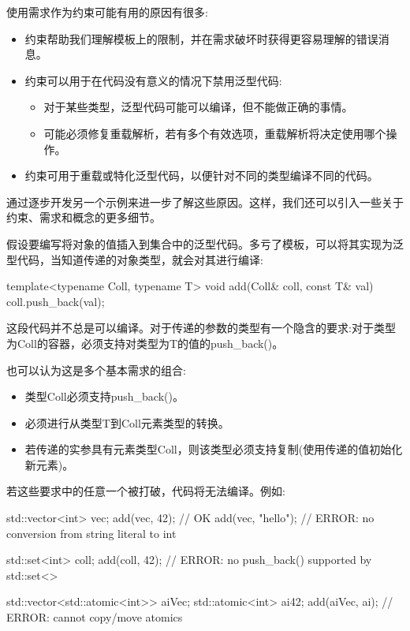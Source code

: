 

使用需求作为约束可能有用的原因有很多:

\begin{itemize}
\item
约束帮助我们理解模板上的限制，并在需求破坏时获得更容易理解的错误消息。

\item
约束可以用于在代码没有意义的情况下禁用泛型代码:
\begin{itemize}
\item
对于某些类型，泛型代码可能可以编译，但不能做正确的事情。

\item
可能必须修复重载解析，若有多个有效选项，重载解析将决定使用哪个操作。
\end{itemize}

\item
约束可用于重载或特化泛型代码，以便针对不同的类型编译不同的代码。
\end{itemize}

通过逐步开发另一个示例来进一步了解这些原因。这样，我们还可以引入一些关于约束、需求和概念的更多细节。


假设要编写将对象的值插入到集合中的泛型代码。多亏了模板，可以将其实现为泛型代码，当知道传递的对象类型，就会对其进行编译:

\begin{cpp}
template<typename Coll, typename T>
void add(Coll& coll, const T& val)
{
	coll.push_back(val);
}
\end{cpp}

这段代码并不总是可以编译。对于传递的参数的类型有一个隐含的要求:对于类型为Coll的容器，必须支持对类型为T的值的push\_back()。

也可以认为这是多个基本需求的组合:

\begin{itemize}
\item
类型Coll必须支持push\_back()。

\item
必须进行从类型T到Coll元素类型的转换。

\item
若传递的实参具有元素类型Coll，则该类型必须支持复制(使用传递的值初始化新元素)。
\end{itemize}

若这些要求中的任意一个被打破，代码将无法编译。例如:


\begin{cpp}
std::vector<int> vec;
add(vec, 42); // OK
add(vec, "hello"); // ERROR: no conversion from string literal to int

std::set<int> coll;
add(coll, 42); // ERROR: no push_back() supported by std::set<>

std::vector<std::atomic<int>> aiVec;
std::atomic<int> ai{42};
add(aiVec, ai); // ERROR: cannot copy/move atomics
\end{cpp}


